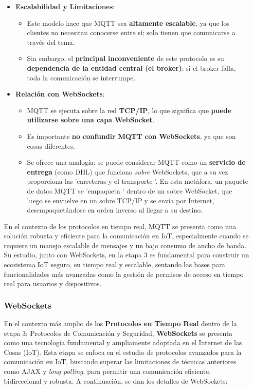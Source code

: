 \documentclass{report}
\begin{document}
\begin{itemize}
    \item \textbf{Escalabilidad y Limitaciones}:
    \begin{itemize}
        \item Este modelo hace que MQTT sea \textbf{altamente escalable}, ya que los clientes no necesitan conocerse entre sí; solo tienen que 
        comunicarse a través del tema.
        \item Sin embargo, el \textbf{principal inconveniente} de este protocolo es su \textbf{dependencia de la entidad central (el broker)}: 
        si el broker falla, toda la comunicación se interrumpe.
    \end{itemize}

    \item \textbf{Relación con WebSockets}:
    \begin{itemize}
        \item MQTT se ejecuta sobre la red \textbf{TCP/IP}, lo que significa que \textbf{puede utilizarse sobre una capa WebSocket}.
        \item Es importante \textbf{no confundir MQTT con WebSockets}, ya que son cosas diferentes.
        \item Se ofrece una analogía: se puede considerar MQTT como un \textbf{servicio de entrega} (como DHL) que funciona \textit{sobre} 
        WebSockets, que a su vez proporciona las  'carreteras y el transporte '. En esta metáfora, un paquete de datos MQTT se  'empaqueta ' dentro de un 
        sobre WebSocket, que luego se envuelve en un sobre TCP/IP y se envía por Internet, desempaquetándose en orden inverso al llegar a su destino.
    \end{itemize}
\end{itemize}
En el contexto de los protocolos en tiempo real, MQTT se presenta como una solución robusta y eficiente para la comunicación en IoT, especialmente cuando 
se requiere un manejo escalable de mensajes y un bajo consumo de ancho de banda. Su estudio, junto con WebSockets, en la etapa 3 es fundamental para 
construir un ecosistema IoT seguro, en tiempo real y escalable, sentando las bases para funcionalidades más avanzadas como la gestión de permisos 
de acceso en tiempo real para usuarios y dispositivos.

\subsubsection{WebSockets}
En el contexto más amplio de los \textbf{Protocolos en Tiempo Real} dentro de la etapa 3: Protocolos de Comunicación y Seguridad, \textbf{WebSockets} 
se presenta como una tecnología fundamental y ampliamente adoptada en el Internet de las Cosas (IoT). Esta etapa se enfoca en el estudio de 
protocolos avanzados para la comunicación en IoT, buscando superar las limitaciones de técnicas anteriores como AJAX y \textit{long polling}, 
para permitir una comunicación eficiente, bidireccional y robusta. A continuación, se dan los detalles de WebSockets:
\end{document}
